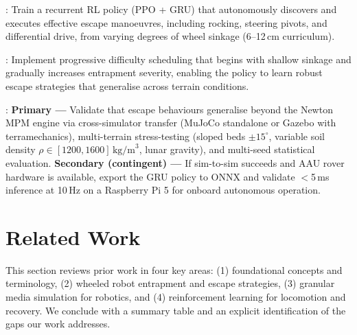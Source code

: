 \documentclass[12pt,a4paper]{article}
\begin{document}
\vspace{4pt}
\begin{tcolorbox}[objbox, colframe=headerblue, title={3.\enspace Recovery Policy}]
: Train a recurrent RL policy (PPO + GRU) that autonomously discovers and executes
effective escape manoeuvres, including rocking, steering pivots, and differential
drive, from varying degrees of wheel sinkage (6–12\,cm curriculum).
\end{tcolorbox}

\vspace{4pt}
\begin{tcolorbox}[objbox, colframe=headerblue, title={4.\enspace Curriculum Learning}]
: Implement progressive difficulty scheduling that begins with shallow sinkage and
gradually increases entrapment severity, enabling the policy to learn robust escape
strategies that generalise across terrain conditions.
\end{tcolorbox}

\vspace{4pt}
\begin{tcolorbox}[objbox, colframe=headerblue, title={5.\enspace Sim-to-Sim Validation \& Sim-to-Real Transfer \textit{(if possible)}}]
: \textbf{Primary ---} Validate that escape behaviours generalise beyond the Newton MPM engine
via cross-simulator transfer (MuJoCo standalone or Gazebo with terramechanics), multi-terrain
stress-testing (sloped beds $\pm15^\circ$, variable soil density $\rho\in[1200,1600]\,\text{kg/m}^3$,
lunar gravity), and multi-seed statistical evaluation.
\textbf{Secondary (contingent) ---} If sim-to-sim succeeds and AAU rover hardware is available,
export the GRU policy to ONNX and validate $<$5\,ms inference at 10\,Hz on a Raspberry Pi 5
for onboard autonomous operation.
\end{tcolorbox}
\vspace{6pt}


\newpage
\section{Related Work}

This section reviews prior work in four key areas: (1) foundational concepts and terminology, (2) wheeled robot entrapment and escape strategies, (3) granular media simulation for robotics, and (4) reinforcement learning for locomotion and recovery. We conclude with a summary table and an explicit identification of the gaps our work addresses.
\end{document}
